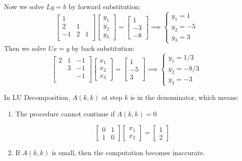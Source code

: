 \documentclass[../main/main.tex]{subfiles}
\begin{document}
\begin{example}
\[  \]
  Now we solve $Ly = b$ by forward substitution: \[
    \begin{bmatrix}
      1&& \\
      2&1&\\
      -1&2&1\\
    \end{bmatrix}
    \begin{bmatrix}
      y_1\\ y_2\\ y_3
    \end{bmatrix}
    = \begin{bmatrix}
1\\-3\\-8
    \end{bmatrix}
    \implies \begin{cases}
      y_1=1\\
      y_2=-5\\
      y_3=3
    \end{cases}
  \]
  Then we solve $Ux = y$ by back substitution: \[
    \begin{bmatrix}
      2&1&-1 \\
      &3&-1\\
      &&-1\\
    \end{bmatrix}
    \begin{bmatrix}
      x_1\\ x_2\\ x_3
    \end{bmatrix}
    = \begin{bmatrix}
1\\-5\\3
    \end{bmatrix}
    \implies \begin{cases}
      y_1=1 / 3\\
      y_2=-8 / 3\\
      y_3=-3
    \end{cases}
  \]
\end{example}
  In LU Decomposition, $A(k,k)$ at step $k$ is in the denominator, which means:
  \begin{enumerate}
\item The procedure cannot continue if $A(k,k)=0$
          \begin{example}
            \[
              \begin{bmatrix}
                0&1\\
                1&0
              \end{bmatrix}
              \begin{bmatrix}
x_1\\ x_2
              \end{bmatrix}
              = \begin{bmatrix}
                1\\ 2
              \end{bmatrix}
            \]
          \end{example}
          \item If $A(k,k)$ is small, then the computation becomes inaccurate.
  \end{enumerate}
\end{document}
